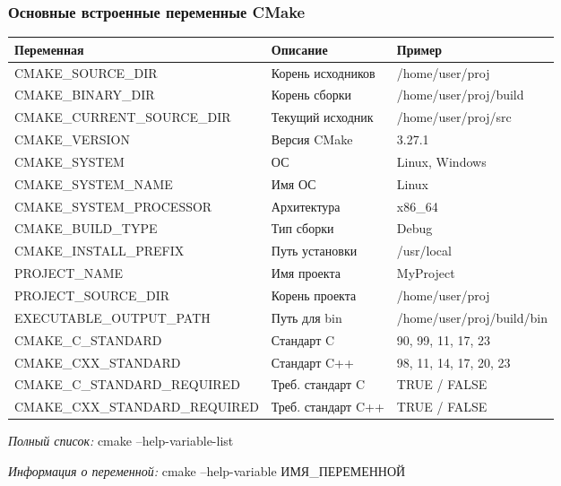 \documentclass[10pt, aspectratio=1610]{beamer}
\begin{document}
\begin{frame}[fragile]\frametitle{Основные встроенные переменные CMake}
	\small
	\begin{tabular}{>{\ttfamily}l l l}
		\hline
		\textbf{Переменная} & \textbf{Описание} & \textbf{Пример} \\
		\hline
		CMAKE\_SOURCE\_DIR & Корень исходников & /home/user/proj \\
		CMAKE\_BINARY\_DIR & Корень сборки & /home/user/proj/build \\
		CMAKE\_CURRENT\_SOURCE\_DIR & Текущий исходник & /home/user/proj/src \\
		CMAKE\_VERSION & Версия CMake & 3.27.1 \\
		CMAKE\_SYSTEM & ОС & Linux, Windows \\
		CMAKE\_SYSTEM\_NAME & Имя ОС & Linux \\
		CMAKE\_SYSTEM\_PROCESSOR & Архитектура & x86\_64 \\
		CMAKE\_BUILD\_TYPE & Тип сборки & Debug \\
		CMAKE\_INSTALL\_PREFIX & Путь установки & /usr/local \\
		PROJECT\_NAME & Имя проекта & MyProject \\
		PROJECT\_SOURCE\_DIR & Корень проекта & /home/user/proj \\
		EXECUTABLE\_OUTPUT\_PATH & Путь для bin & /home/user/proj/build/bin \\
		CMAKE\_C\_STANDARD & Стандарт C & 90, 99, 11, 17, 23 \\
		CMAKE\_CXX\_STANDARD & Стандарт C++ & 98, 11, 14, 17, 20, 23 \\
		CMAKE\_C\_STANDARD\_REQUIRED & Треб. стандарт C & TRUE / FALSE \\
		CMAKE\_CXX\_STANDARD\_REQUIRED & Треб. стандарт C++ & TRUE / FALSE \\
		\hline
	\end{tabular}
	
	\footnotesize{\textit{Полный список:} \ttfamily cmake --help-variable-list}
	
	\footnotesize{\textit{Информация о переменной:} \ttfamily cmake --help-variable ИМЯ\_ПЕРЕМЕННОЙ}
\end{frame}
\end{document}

